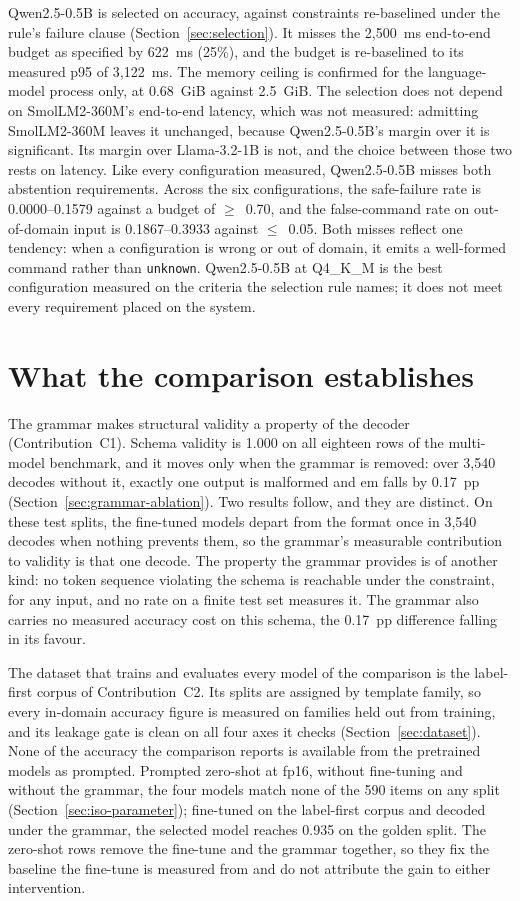 Qwen2.5-0.5B is selected on accuracy, against constraints re-baselined under the rule's failure
clause (Section~\ref{sec:selection}). It misses the 2{,}500~ms end-to-end budget as specified by
622~ms (25\%), and the budget is re-baselined to its measured p95 of 3{,}122~ms. The memory
ceiling is confirmed for the language-model process only, at 0.68~GiB against 2.5~GiB. The
selection does not depend on SmolLM2-360M's end-to-end latency, which was not measured: admitting
SmolLM2-360M leaves it unchanged, because Qwen2.5-0.5B's margin over it is significant. Its margin
over Llama-3.2-1B is not, and the choice between those two rests on latency. Like every
configuration measured, Qwen2.5-0.5B misses both abstention requirements. Across the six
configurations, the safe-failure rate is 0.0000--0.1579 against a budget of $\geq$~0.70, and the
false-command rate on out-of-domain input is 0.1867--0.3933 against $\leq$~0.05. Both misses reflect
one tendency: when a configuration is wrong or out of domain, it emits a well-formed command rather
than \texttt{unknown}. Qwen2.5-0.5B at
Q4\_K\_M is the best configuration measured on the criteria the selection rule names; it does not
meet every requirement placed on the system.

\section{What the comparison establishes}
\label{sec:established}

The grammar makes structural validity a property of the decoder (Contribution~C1). Schema validity
is 1.000 on all eighteen rows of the multi-model benchmark, and it moves only when the grammar is
removed: over 3{,}540 decodes without it, exactly one output is malformed and \gls{em} falls by
0.17~pp (Section~\ref{sec:grammar-ablation}). Two results follow, and they are distinct. On these
test splits, the fine-tuned models depart from the format once in 3{,}540 decodes when nothing
prevents them, so the grammar's measurable contribution to validity is that one decode. The
property the grammar provides is of another kind: no token sequence violating the schema is
reachable under the constraint, for any input, and no rate on a finite test set measures it. The
grammar also carries no measured accuracy cost on this schema, the 0.17~pp difference falling in
its favour.

The dataset that trains and evaluates every model of the comparison is the label-first corpus of
Contribution~C2. Its splits are assigned by template family, so every in-domain accuracy figure is
measured on families held out from training, and its leakage gate is clean on all four axes it
checks (Section~\ref{sec:dataset}). None of the accuracy the comparison reports is available from
the pretrained models as prompted. Prompted zero-shot at fp16, without fine-tuning and without the grammar, the
four models match none of the 590 items on any split (Section~\ref{sec:iso-parameter}); fine-tuned
on the label-first corpus and decoded under the grammar, the selected model reaches 0.935 on the
golden split. The zero-shot rows remove the fine-tune and the grammar together, so they fix the
baseline the fine-tune is measured from and do not attribute the gain to either intervention.

